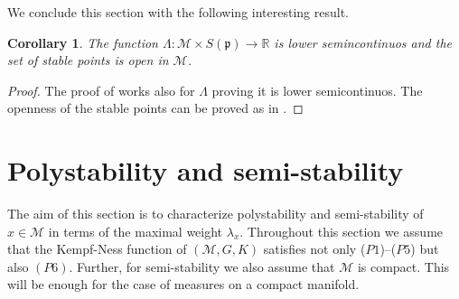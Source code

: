 \documentclass[leqno,11pt, a4]{amsart}
\newtheorem{cor}[equation]{Corollary}
\theoremstyle{named}
\begin{document}
We conclude this section with the following interesting result.
\begin{cor}\label{stable-open-abstract-setting}
The function $\Lambda : {\mathscr{M}} \times S({\mathfrak{p}}) {\longrightarrow} {\mathbb{R}} $ is lower semincontinuos  and  the set of stable points is open in ${\mathscr{M}}$.
\end{cor}
\begin{proof}
The proof of \cite[Lemma 3.9]{bgs} works also for $\Lambda$ proving it is lower semicontinuos.  The openness of the stable points can be proved  as in \cite[Corollary 3.10]{bgs}.
\end{proof}
\section{Polystability and semi-stability}
\label{sec:polyst-semi-stab}
The aim of this section is to characterize polystability and semi-stability of $x \in {\mathscr{M}}$ in terms of the maximal weight
${\lambda}_x$. 
Throughout this section we assume that the Kempf-Ness function of $({\mathscr{M}},G,K)$ satisfies not only ($P1$)--($P5$) but also $(P6)$. Further, for semi-stability we also assume that ${\mathscr{M}}$ is compact. This will be enough for the case of measures on a compact manifold.
\end{document}
